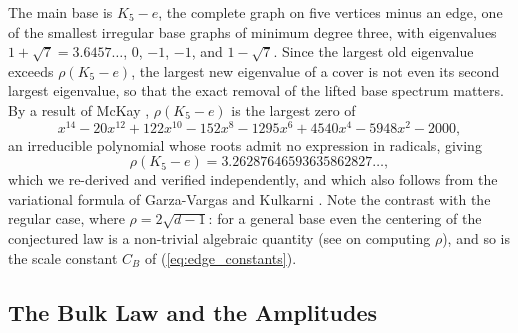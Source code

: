 \documentclass[12pt,oneside,english]{amsart}
\numberwithin{equation}{section}
\numberwithin{figure}{section}
\numberwithin{table}{section}
\theoremstyle{plain}
\numberwithin{thm}{section}
\theoremstyle{plain}
\theoremstyle{plain}
\theoremstyle{plain}
\theoremstyle{definition}
\theoremstyle{definition}
\theoremstyle{definition}
\theoremstyle{remark}
\begin{document}
The main base is $K_{5}-e$, the complete graph on five vertices minus
an edge, one of the smallest irregular base graphs of minimum degree
three, with eigenvalues $1+\sqrt{7}=3.6457\dots$, $0$, $-1$, $-1$,
and $1-\sqrt{7}$. Since the largest old eigenvalue exceeds $\rho(K_{5}-e)$,
the largest new eigenvalue of a cover is not even its second largest
eigenvalue, so that the exact removal of the lifted base spectrum
matters. By a result of McKay \cite{McKay2023}, $\rho(K_{5}-e)$
is the largest zero of
\[
x^{14}-20x^{12}+122x^{10}-152x^{8}-1295x^{6}+4540x^{4}-5948x^{2}-2000,
\]
an irreducible polynomial whose roots admit no expression in radicals,
giving
\[
\rho(K_{5}-e)=3.26287646593635862827\dots,
\]
which we re-derived and verified independently, and which also follows
from the variational formula of Garza-Vargas and Kulkarni \cite{GarzaVargasKulkarni2023}.
Note the contrast with the regular case, where $\rho=2\sqrt{d-1}$:
for a general base even the centering of the conjectured law is a
non-trivial algebraic quantity (see \cite{AngelFriedmanHoory2015,GarzaVargasKulkarni2023,McKay2023}
on computing $\rho$), and so is the scale constant $C_{B}$ of (\ref{eq:edge_constants}).

\subsection{\label{subsec:bulk_law}The Bulk Law and the Amplitudes}
\end{document}
